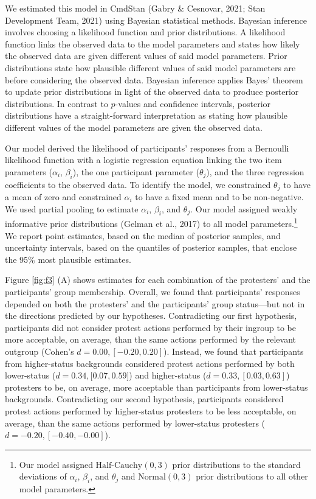 \documentclass[12pt, letterpaper]{article}
\begin{document}
We estimated this model in CmdStan (Gabry \& Cesnovar, 2021; Stan
Development Team, 2021) using Bayesian statistical methods. Bayesian
inference involves choosing a likelihood function and prior
distributions. A likelihood function links the observed data to the
model parameters and states how likely the observed data are given
different values of said model parameters. Prior distributions state how
plausible different values of said model parameters are before
considering the observed data. Bayesian inference applies Bayes' theorem
to update prior distributions in light of the observed data to produce
posterior distributions. In contrast to \(p\)-values and confidence
intervals, posterior distributions have a straight-forward
interpretation as stating how plausible different values of the model
parameters are given the observed data.

Our model derived the likelihood of participants' responses from a
Bernoulli likelihood function with a logistic regression equation
linking the two item parameters (\(\alpha_i\), \(\beta_i\)), the one
participant parameter (\(\theta_j\)), and the three regression
coefficients to the observed data. To identify the model, we constrained
\(\theta_j\) to have a mean of zero and constrained \(\alpha_i\) to have
a fixed mean and to be non-negative. We used partial pooling to estimate
\(\alpha_i\), \(\beta_i\), and \(\theta_j\). Our model assigned weakly
informative prior distributions (Gelman et al., 2017) to all model
parameters.\footnote{Our model assigned \(\text{Half-Cauchy} (0, 3)\)
  prior distributions to the standard deviations of \(\alpha_i\),
  \(\beta_i\), and \(\theta_j\) and \(\text{Normal} (0, 3)\) prior
  distributions to all other model parameters.} We report point
estimates, based on the median of posterior samples, and uncertainty
intervals, based on the quantiles of posterior samples, that enclose the
95\% most plausible estimates.

Figure \ref{fig:f3} (A) shows estimates for each combination of the
protesters' and the participants' group membership. Overall, we found
that participants' responses depended on both the protesters' and the
participants' group status---but not in the directions predicted by our
hypotheses. Contradicting our first hypothesis, participants did not
consider protest actions performed by their ingroup to be more
acceptable, on average, than the same actions performed by the relevant
outgroup (Cohen's \(d = 0.00, [-0.20, 0.20]\)). Instead, we found that
participants from higher-status backgrounds considered protest actions
performed by both lower-status (\(d = 0.34, [0.07, 0.59\){]}) and
higher-status (\(d = 0.33, [0.03, 0.63]\)) protesters to be, on average,
more acceptable than participants from lower-status backgrounds.
Contradicting our second hypothesis, participants considered protest
actions performed by higher-status protesters to be less acceptable, on
average, than the same actions performed by lower-status protesters
(\(d = -0.20, [-0.40, -0.00]\)).
\end{document}
